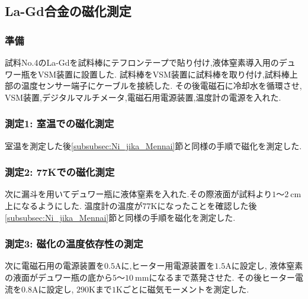 \subsection{La-Gd合金の磁化測定}
\subsubsection{準備}
試料No.4のLa-Gdを試料棒にテフロンテープで貼り付け,液体窒素導入用のデュワー瓶をVSM装置に設置した.
試料棒をVSM装置に試料棒を取り付け,試料棒上部の温度センサー端子にケーブルを接続した.
その後電磁石に冷却水を循環させ, VSM装置,デジタルマルチメータ,電磁石用電源装置,温度計の電源を入れた.
\subsubsection{測定1: 室温での磁化測定}
室温を測定した後\ref{subsubsec:Ni_jika_Mennai}節と同様の手順で磁化を測定した.
\subsubsection{測定2: 77Kでの磁化測定}
次に漏斗を用いてデュワー瓶に液体窒素を入れた.その際液面が試料より$1〜2\ \si{\centi\metre}$上になるようにした.
温度計の温度が$77\si{\kelvin}$になったことを確認した後\ref{subsubsec:Ni_jika_Mennai}節と同様の手順を磁化を測定した.
\subsubsection{測定3: 磁化の温度依存性の測定}
次に電磁石用の電源装置を$0.5\si{\ampere}$に,ヒーター用電源装置を$1.5\si{\ampere}$に設定し,
液体窒素の液面がデュワー瓶の底から$5〜10\ \si{\milli\metre}$になるまで蒸発させた.
その後ヒーター電流を$0.8\si{\ampere}$に設定し, $290\si{\kelvin}$まで$1\si{\kelvin}$ごとに磁気モーメントを測定した.